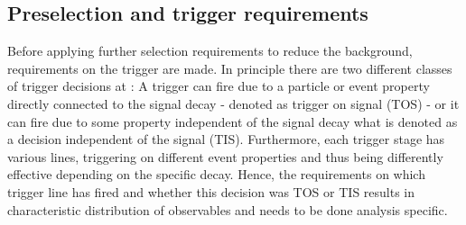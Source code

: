 \subsection{Preselection and trigger requirements}
\label{sec:preselTrigger}

Before applying further selection requirements to reduce the background, requirements on the trigger are made.
In principle there are two different classes of trigger decisions at \lhcb: A trigger can fire due to a particle or event property directly connected to the signal decay - denoted as trigger on signal (TOS) - or it can fire due to some property independent of the signal decay what is denoted as a decision independent of the signal (TIS).
Furthermore, each trigger stage has various lines, triggering on different event properties and thus being differently effective depending on the specific decay.
Hence, the requirements on which trigger line has fired and whether this decision was TOS or TIS results in characteristic distribution of observables and needs to be done analysis specific.

